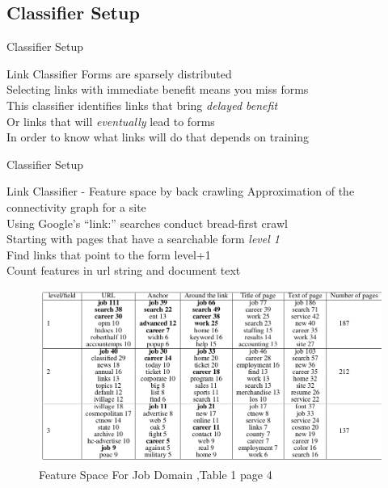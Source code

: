 \documentclass{beamer}
\begin{document}
\subsection{Classifier Setup}
\begin{frame}{Classifier Setup}
\begin{block}{Link Classifier}
Forms are sparsely distributed \\
Selecting links with immediate benefit means you miss forms \\
This classifier identifies links that bring \emph{delayed benefit} \\
Or links that will \emph{eventually} lead to forms \\
In order to know what links will do that depends on training \\
\end{block}
\end{frame}
\begin{frame}{Classifier Setup}
\begin{block}{Link Classifier - Feature space by back crawling}
Approximation of the connectivity graph for a site \\
Using Google's ``link:'' searches conduct bread-first crawl \\
Starting with pages that have a searchable form \emph{level 1} \\
Find links that point to the form level+1 \\
Count features in url string and document text \\
\end{block}
\begin{figure}
			\includegraphics[scale=0.23]{lfs.png}
			\caption{\footnotesize{Feature Space For Job Domain} ,Table 1 page 4}
		\end{figure}
\end{frame}
\end{document}
